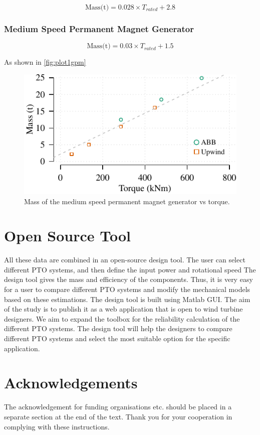 \documentclass{article}\usepackage{graphicx, color}
\makeatletter
\def\maxwidth{ %
  \ifdim\Gin@nat@width>\linewidth
    \linewidth
  \else
    \Gin@nat@width
  \fi
}
\newenvironment{knitrout}{}{} %
\makeatother
\begin{document}
\begin{equation}
  \text{Mass(t)} = 0.028 \times {T_{rated}} + 2.8
\end{equation}


\subsubsection{Medium Speed Permanent Magnet Generator}

\begin{equation}
  \text{Mass(t)} = 0.03 \times {T_{rated}} + 1.5
\end{equation}

As shown in \autoref{fig:plot1gpm}

\begin{knitrout}
\color{fgcolor}\begin{figure}[]

\includegraphics[width=\maxwidth]{figure/plot1gpm} \caption[Mass of the medium speed permanent magnet generator vs torque]{Mass of the medium speed permanent magnet generator vs torque.\label{fig:plot1gpm}}
\end{figure}


\end{knitrout}



\section{Open Source Tool}
All these data are combined in an open-source design tool. The user can select different PTO systems, and then define the input power and rotational speed The design tool gives the mass and efficiency of the components. Thus, it is very easy for a user to compare different PTO systems and modify the mechanical models based on these estimations. The design tool is built using Matlab GUI. The aim of the study is to publish it as a web application that is open to wind turbine designers. We aim to expand the toolbox for the reliability calculation of the different PTO systems. The design tool will help the designers to compare different PTO systems and select the most suitable option for the specific application.

\section*{Acknowledgements}
The acknowledgement for funding organisations etc.
should be placed in a separate section at the end of the
text. Thank you for your cooperation in complying with
these instructions.


\noindent

\end{document}
